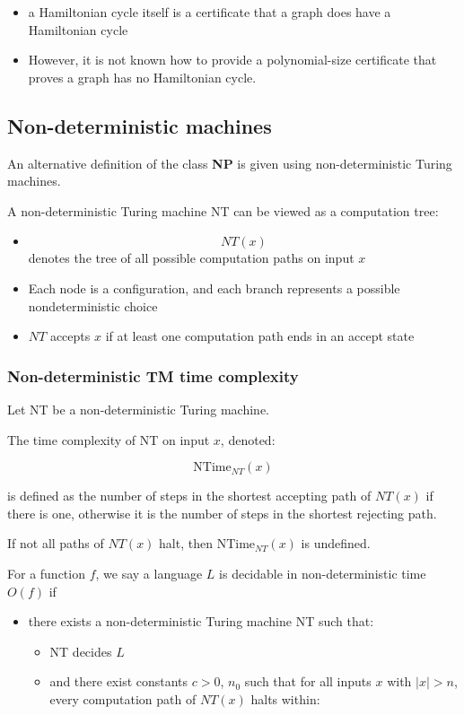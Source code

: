 \documentclass[11pt]{article}
\providecommand{\tightlist}{%
      \setlength{\itemsep}{0pt}\setlength{\parskip}{0pt}}
\begin{document}
\begin{itemize}
\tightlist
\item
  a Hamiltonian cycle itself is a certificate that a graph does have a
  Hamiltonian cycle
\item
  However, it is not known how to provide a polynomial-size certificate
  that proves a graph has no Hamiltonian cycle.
\end{itemize}

    \subsection{Non-deterministic
machines}\label{non-deterministic-machines}

An alternative definition of the class \textbf{NP} is given using
non-deterministic Turing machines.

A non-deterministic Turing machine NT can be viewed as a computation
tree:

\begin{itemize}
\tightlist
\item
  \[NT(x)\] denotes the tree of all possible computation paths on input
  \(x\)
\item
  Each node is a configuration, and each branch represents a possible
  nondeterministic choice
\item
  \(NT\) accepts \(x\) if at least one computation path ends in an
  accept state
\end{itemize}

\subsubsection{Non-deterministic TM time
complexity}\label{non-deterministic-tm-time-complexity}

Let NT be a non-deterministic Turing machine.

The time complexity of NT on input \(x\), denoted:

\[
\text{NTime}_{NT}(x)
\]

is defined as the number of steps in the shortest accepting path of
\(NT(x)\) if there is one, otherwise it is the number of steps in the
shortest rejecting path.

If not all paths of \(NT(x)\) halt, then \(\text{NTime}_{NT}(x)\) is
undefined.

For a function \(f\), we say a language \(L\) is decidable in
non-deterministic time \(O(f)\) if

\begin{itemize}
\tightlist
\item
  there exists a non-deterministic Turing machine NT such that:

  \begin{itemize}
  \tightlist
  \item
    NT decides \(L\)
  \item
    and there exist constants \(c>0\), \(n_0\) such that for all inputs
    \(x\) with \(|x|>n\), every computation path of \(NT(x)\) halts
    within:
  \end{itemize}
\end{itemize}
\end{document}
